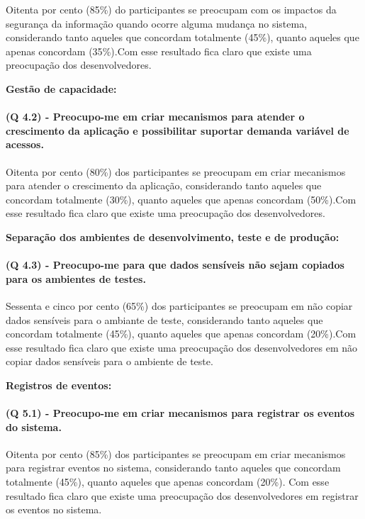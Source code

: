 Oitenta por cento (85{\%}) do participantes se preocupam com os impactos da segurança da informação quando ocorre alguma mudança no sistema, considerando tanto aqueles que concordam totalmente (45{\%}), quanto aqueles que apenas concordam (35{\%}).Com esse resultado fica claro que existe uma preocupação dos desenvolvedores.

\vspace{4cm}
\noindent\textbf{Gestão de capacidade:}
\paragraph{\textbf{(Q 4.2)} - Preocupo-me em criar mecanismos para atender o crescimento da aplicação e possibilitar suportar demanda variável de acessos.}

Oitenta por cento (80{\%}) dos participantes se preocupam em criar mecanismos para atender o crescimento da aplicação, considerando tanto aqueles que concordam totalmente (30{\%}), quanto aqueles que apenas concordam (50{\%}).Com esse resultado fica claro que existe uma preocupação dos desenvolvedores.

\vspace{0.5cm}
\noindent\textbf{Separação dos ambientes de desenvolvimento, teste e de produção:}
\paragraph{\textbf{(Q 4.3)} - Preocupo-me para que dados sensíveis não sejam copiados para os ambientes de testes.}

Sessenta e cinco por cento (65{\%}) dos participantes se preocupam em não copiar dados sensíveis para o ambiante de teste, considerando tanto aqueles que concordam totalmente (45{\%}), quanto aqueles que apenas concordam (20{\%}).Com esse resultado fica claro que existe uma preocupação dos desenvolvedores em não copiar dados sensíveis para o ambiente de teste. 

\vspace{0.5cm} 
\noindent\textbf{Registros de eventos:}
\paragraph{\textbf{(Q 5.1)} - Preocupo-me em criar mecanismos para registrar os eventos do sistema.}

Oitenta por cento (85{\%}) dos participantes se preocupam em criar mecanismos para registrar eventos no sistema, considerando tanto aqueles que concordam totalmente (45{\%}), quanto aqueles que apenas concordam (20{\%}). Com esse resultado fica claro que existe uma preocupação dos desenvolvedores em registrar os eventos no sistema.

